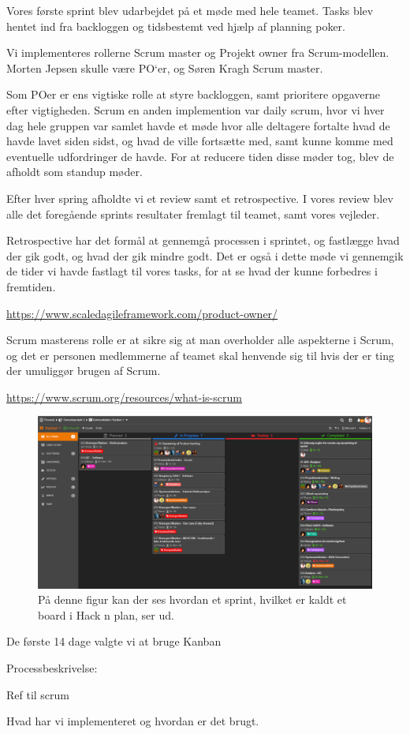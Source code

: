 \documentclass[a4paper, 12pt]{article}
\begin{document}
Vores første sprint blev udarbejdet på et møde med hele teamet. Tasks blev hentet ind fra backloggen og tidsbestemt ved hjælp af planning poker.

Vi implementeres rollerne Scrum master og Projekt owner fra Scrum-modellen. Morten Jepsen skulle være PO‘er, og Søren Kragh Scrum master.

Som POer er ens vigtiske rolle at styre backloggen, samt prioritere opgaverne efter vigtigheden. Scrum en anden implemention var daily scrum, hvor vi hver dag hele gruppen var samlet havde et møde hvor alle deltagere fortalte hvad de havde lavet siden sidst, og hvad de ville fortsætte med, samt kunne komme med eventuelle udfordringer de havde. For at reducere tiden disse møder tog, blev de afholdt som standup møder.

Efter hver spring afholdte vi et review samt et retrospective. I vores review blev alle det foregående sprints resultater fremlagt til teamet, samt vores vejleder.

Retrospective har det formål at gennemgå processen i sprintet, og fastlægge hvad der gik godt, og hvad der gik mindre godt. Det er også i dette møde vi gennemgik de tider vi havde fastlagt til vores tasks, for at se hvad der kunne forbedres i fremtiden.

\url{https://www.scaledagileframework.com/product-owner/}

Scrum masterens rolle er at sikre sig at man overholder alle aspekterne i Scrum, og det er personen medlemmerne af teamet skal henvende sig til hvis der er ting der umuliggør brugen af Scrum.

\url{https://www.scrum.org/resources/what-is-scrum}

\begin{figure}[h!]
\centering
\includegraphics[width=1\textwidth]{"HnP Board"}
\caption{På denne figur kan der ses hvordan et sprint, hvilket er kaldt et board i Hack n plan, ser ud.}
\label{image-board}
\end{figure}

De første 14 dage valgte vi at bruge Kanban 

Processbeskrivelse:

Ref til scrum

Hvad har vi implementeret og hvordan er det brugt.
\end{document}
